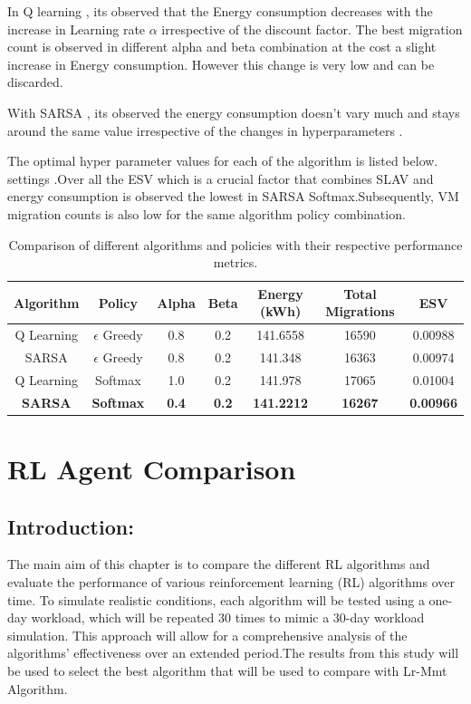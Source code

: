 \documentclass[a4paper,12pt]{Classes/RoboticsLaTeX}
\begin{document}
        In Q learning , its observed that the Energy consumption decreases with the increase in Learning rate $\alpha$ irrespective of the discount factor. The best migration count is observed in different alpha and beta combination at the cost a slight increase in Energy consumption. However this change is very low and can be discarded.

        With SARSA , its observed the energy consumption doesn't vary  much and stays around the same value irrespective of the changes in hyperparameters . 

        The optimal hyper parameter values for each of the algorithm  is listed below.  settings .Over all the ESV which is a crucial factor that combines SLAV and energy consumption is observed the lowest in SARSA Softmax.Subsequently,  VM migration counts is also low for the same algorithm policy combination.

        \begin{table}[H]
        \centering
        \begin{tabular}{|c|c|c|c|c|c|c|}
        \hline
        \textbf{Algorithm} & \textbf{Policy} & \textbf{Alpha} & \textbf{Beta} & \textbf{Energy (kWh)} & \textbf{Total Migrations} & \textbf{ESV} \\ 
        \hline
        Q Learning & $\epsilon$ Greedy & 0.8 & 0.2 & 141.6558 & 16590 & 0.00988 \\ 
        SARSA & $\epsilon$ Greedy & 0.8 & 0.2 & 141.348 & 16363 & 0.00974 \\ 
        Q Learning & Softmax & 1.0 & 0.2 & 141.978 & 17065 & 0.01004 \\ 
        \textbf{SARSA} & \textbf{Softmax} & \textbf{0.4} & \textbf{0.2} & \textbf{141.2212} & \textbf{16267} & \textbf{0.00966} \\ 
        \hline
        \end{tabular}
        \caption{Comparison of different algorithms and policies with their respective performance metrics.}
        \end{table} 

        \chapter{RL Agent Comparison}
	\label{chap:results}

         \section{Introduction:}
         The main aim of this chapter is to compare the different RL algorithms and evaluate the performance of various reinforcement learning (RL) algorithms over time.  To simulate realistic conditions, each algorithm will be tested using a one-day workload, which will be repeated 30 times to mimic a 30-day workload simulation. This approach will allow for a comprehensive analysis of the algorithms' effectiveness over an extended period.The results from this study will be used to select the best algorithm that will be used to compare with Lr-Mmt Algorithm. 
\end{document}

